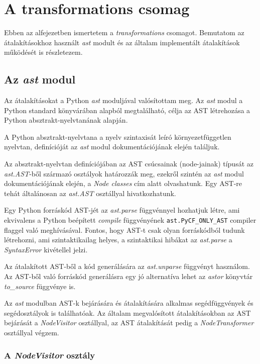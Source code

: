 \section{A transformations csomag}

Ebben az alfejezetben ismertetem a \emph{transformations} csomagot.
Bemutatom az átalakításokhoz használt \emph{ast} modult és
az általam implementált átalakítások működését is részletezem.

\subsection{Az \emph{ast} modul}

Az átalakításokat a Python \emph{ast} moduljával valósítottam meg.
Az \emph{ast} modul a Python standard könyvárában alapból megtalálható, 
célja az AST létrehozása a Python absztrakt-nyelvtanának alapján.

A Python absztrakt-nyelvtana a nyelv szintaxisát leíró környezetfüggetlen nyelvtan,
definícióját az \emph{ast} modul dokumentációjának \cite{pythonAST} elején találjuk.

Az absztrakt-nyelvtan definíciójában az AST csúcsainak (node-jainak) típusát az
\emph{ast.AST}-ből származó osztályok határozzák meg,
ezekről szintén az \emph{ast} modul dokumentációjának elején,
a \emph{Node classes} cím alatt olvashatunk.
Egy AST-re tehát általánosan az \emph{ast.AST} osztállyal hivatkozhatunk.

Egy Python forráskód AST-jét az \emph{ast.parse} függvénnyel hozhatjuk létre,
ami ekvivalens a Python beépített \emph{compile} függvényének
\texttt{ast.PyCF\_ONLY\_AST} compiler flaggel való meghívásával.
Fontos, hogy AST-t csak olyan forráskódból tudunk létrehozni, ami szintaktikailag helyes,
a szintaktikai hibákat az \emph{ast.parse} a \emph{SyntaxError} kivétellel jelzi.

Az átalakított AST-ből a kód generálására az \emph{ast.unparse} függvényt használom.
Az AST-ből való forráskód generálásra egy jó alternatíva lehet az \emph{astor} könyvtár \cite{astor}
\emph{to\_source} függvénye is.

Az \emph{ast} modulban AST-k bejárására és átalakítására alkalmas
segédfüggvények és segédosztályok is találhatóak.
Az általam megvalósított átalakításokban
az AST bejárását a \emph{NodeVisitor} osztállyal, az AST átalakítását pedig a \emph{NodeTransformer} osztállyal
végzem.

\subsubsection{A \emph{NodeVisitor} osztály}


